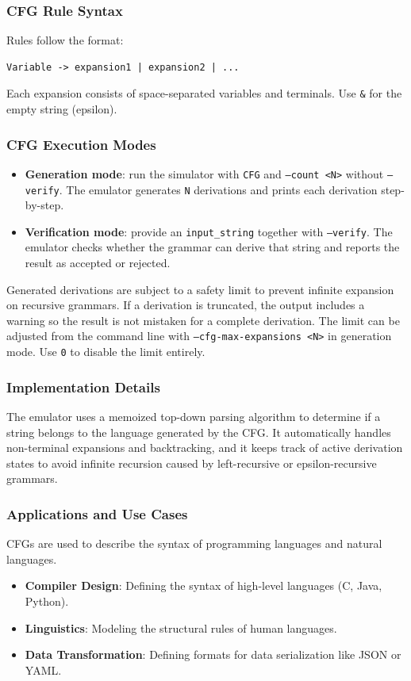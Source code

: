 \documentclass{article}
\begin{document}
\subsubsection{CFG Rule Syntax}
Rules follow the format:
\begin{lstlisting}
Variable -> expansion1 | expansion2 | ...
\end{lstlisting}
Each expansion consists of space-separated variables and terminals. Use \texttt{\&} for the empty string (epsilon).

\subsubsection{CFG Execution Modes}
\begin{itemize}
    \item \textbf{Generation mode}: run the simulator with \texttt{CFG} and \texttt{--count <N>} without \texttt{--verify}. The emulator generates \texttt{N} derivations and prints each derivation step-by-step.
    \item \textbf{Verification mode}: provide an \texttt{input\_string} together with \texttt{--verify}. The emulator checks whether the grammar can derive that string and reports the result as accepted or rejected.
\end{itemize}

Generated derivations are subject to a safety limit to prevent infinite expansion on recursive grammars. If a derivation is truncated, the output includes a warning so the result is not mistaken for a complete derivation.
The limit can be adjusted from the command line with \texttt{--cfg-max-expansions <N>} in generation mode. Use \texttt{0} to disable the limit entirely.

\subsubsection{Implementation Details}
The emulator uses a memoized top-down parsing algorithm to determine if a string belongs to the language generated by the CFG. It automatically handles non-terminal expansions and backtracking, and it keeps track of active derivation states to avoid infinite recursion caused by left-recursive or epsilon-recursive grammars.

\subsubsection{Applications and Use Cases}
CFGs are used to describe the syntax of programming languages and natural languages.
\begin{itemize}
    \item \textbf{Compiler Design}: Defining the syntax of high-level languages (C, Java, Python).
    \item \textbf{Linguistics}: Modeling the structural rules of human languages.
    \item \textbf{Data Transformation}: Defining formats for data serialization like JSON or YAML.
\end{itemize}
\end{document}
